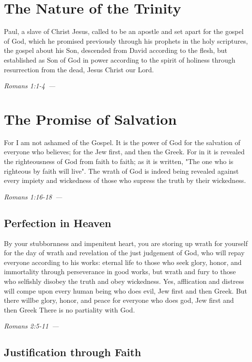 \documentclass[10pt]{article}
\let\oldquote\quote
\let\endoldquote\endquote
\renewenvironment{quote}[2][]
  {\if\relax\detokenize{#1}\relax
     \def\quoteauthor{#2}%
   \else
     \def\quoteauthor{#2~---~#1}%
   \fi
   \oldquote}
  {\par\nobreak\smallskip\hfill\textit{\quoteauthor}%
   \endoldquote\addvspace{\bigskipamount}}
\begin{document}
\section*{The Nature of the Trinity}
\begin{quote}{Romans 1:1-4}
Paul, a slave of Christ Jesus, called to be an apostle and set apart for the gospel of God, which he promised previously through his prophets in the holy scriptures, the gospel about his Son, descended from David according to the flesh, but established as Son of God in power according to the spirit of holiness through resurrection from the dead, Jesus Christ our Lord.
\end{quote}

\section*{The Promise of Salvation}
\begin{quote}{Romans 1:16-18}
For I am not ashamed of the Gospel. It is the power of God for the salvation of everyone who believes; for the Jew first, and then the Greek. For in it is revealed the righteousness of God from faith to faith; as it is written, "The one who is righteous by faith will live". The wrath of God is indeed being revealed against every impiety and wickedness of those who supress the truth by their wickedness. 
\end{quote}

\subsection{Perfection in Heaven}
\begin{quote}{Romans 2:5-11}
By your stubbornness and impenitent heart, you are storing up wrath for yourself for the day of wrath and revelation of the just judgement of God, who will repay everyone according to his works: eternal life to those who seek glory, honor, and immortality through perseverance in good works, but wrath and fury to those who selfishly disobey the truth and obey wickedness. Yes, afflication and distress will compe upon every human being who does evil, Jew first and then Greek. But there willbe glory, honor, and peace for everyone who does god, Jew first and then Greek There is no partiality with God. 
\end{quote}

\subsection*{Justification through Faith}
\end{document}
